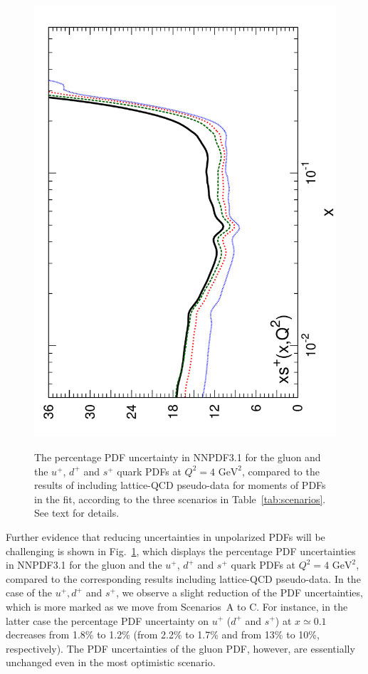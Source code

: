 \begin{figure}[!t]
\includegraphics[angle=270,scale=0.35]{plots/UNPs}\\
\caption{\small The percentage PDF uncertainty in NNPDF3.1  
  for the gluon and the $u^+$, $d^+$ and $s^+$ quark PDFs at
  $Q^2=4\text{ GeV}^2$,
  compared to the results of including lattice-QCD pseudo-data for
  moments of PDFs in the fit, according to the three
  scenarios in Table~\ref{tab:scenarios}.
  See text for details.
}    
\label{fig:impactUnpol}
\end{figure}

Further evidence that reducing uncertainties in unpolarized PDFs will be 
challenging is shown in Fig.~\ref{fig:impactUnpol}, which displays the 
percentage PDF uncertainties in NNPDF3.1 for the gluon and the
$u^+$, $d^+$ and $s^+$ quark PDFs at $Q^2=4\text{ GeV}^2$, compared to the 
corresponding results including lattice-QCD pseudo-data.
%
In the case of the $u^+,d^+$ and $s^+$, we observe a slight reduction
of the PDF uncertainties, which is more marked as we move
from Scenarios~A to C.
%
For instance, in the latter case the percentage PDF
uncertainty on $u^+$ ($d^+$ and $s^+$) at $x\simeq 0.1$
decreases from 1.8\% to 1.2\% (from 2.2\% to 1.7\% and from 13\% to 10\%, 
respectively).
%
The PDF uncertainties of the gluon PDF, however,
are essentially unchanged even in the most optimistic scenario.

